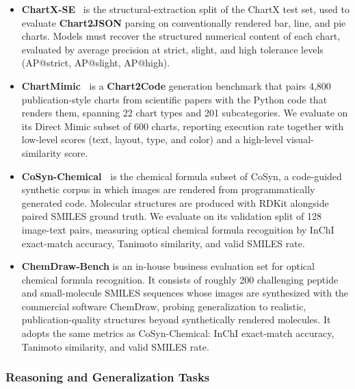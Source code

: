 \begin{itemize}[
  leftmargin=1.0em,
  labelsep=0.5em
]
    \item \textbf{ChartX-SE}~\cite{chen2024onechart} is the structural-extraction split of the ChartX test set, used to evaluate \textbf{Chart2JSON} parsing on conventionally rendered bar, line, and pie charts. Models must recover the structured numerical content of each chart, evaluated by average precision at strict, slight, and high tolerance levels (AP@strict, AP@slight, AP@high).

    \item \textbf{ChartMimic~\cite{chartmimic}} is a \textbf{Chart2Code} generation benchmark that pairs 4,800 publication-style charts from scientific papers with the Python code that renders them, spanning 22 chart types and 201 subcategories. We evaluate on its Direct Mimic subset of 600 charts, reporting execution rate together with low-level scores (text, layout, type, and color) and a high-level visual-similarity score.

    \item \textbf{CoSyn-Chemical~\cite{cosyn}} is the chemical formula subset of CoSyn, a code-guided synthetic corpus in which images are rendered from programmatically generated code. Molecular structures are produced with RDKit alongside paired SMILES ground truth. We evaluate on its validation split of 128 image-text pairs, measuring optical chemical formula recognition by InChI exact-match accuracy, Tanimoto similarity, and valid SMILES rate.

    \item \textbf{ChemDraw-Bench} is an in-house business evaluation set for optical chemical formula recognition. It consists of roughly 200 challenging peptide and small-molecule SMILES sequences whose images are synthesized with the commercial software ChemDraw, probing generalization to realistic, publication-quality structures beyond synthetically rendered molecules. It adopts the same metrics as CoSyn-Chemical: InChI exact-match accuracy, Tanimoto similarity, and valid SMILES rate.

\end{itemize}

\subsubsection*{Reasoning and Generalization Tasks}


